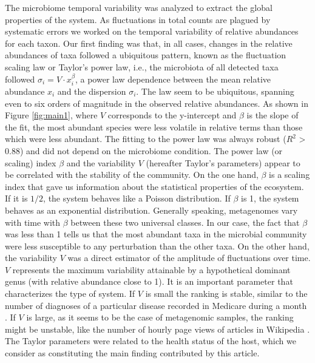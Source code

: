 
The microbiome temporal variability was analyzed to extract the global properties of the system. As fluctuations in total counts are plagued by systematic errors we worked on the temporal variability of relative abundances for each taxon. Our first finding was that, in all cases, changes in the relative abundances of taxa followed a ubiquitous pattern, known as the fluctuation scaling law\cite{fs} or Taylor's power law\cite{taylor}, i.e., the microbiota of all detected taxa followed $\sigma_i  = V\cdot x_i^{\beta}$, a power law dependence between the mean relative abundance $x_i$ and the dispersion $\sigma_i$. The law seem to be ubiquitous, spanning even to six orders of magnitude in the observed relative abundances. As shown in Figure \ref{fig:main1}, where $V$ corresponds to the y-intercept and $\beta$ is the slope of the fit, the most abundant species were less volatile in relative terms than those which were less abundant. The fitting to the power law was always robust ($R^{2}$ > 0.88) and did not depend on the microbiome condition. The power law (or scaling) index $\beta$ and the variability $V$ (hereafter Taylor's parameters) appear to be correlated with the stability of the community. On the one hand, $\beta$ is a scaling index that gave us information about the statistical properties of the ecosystem. If it is $1/2$, the system behaves like a Poisson distribution. If $\beta$ is 1, the system behaves as an exponential distribution. Generally speaking, metagenomes vary with time with $\beta$ between these two universal classes. In our case, the fact that $\beta$ was less than 1 tells us that the most abundant taxa in the microbial community were less susceptible to any perturbation than the other taxa. On the other hand, the variability $V$ was a direct estimator of the amplitude of fluctuations over time. $V$ represents the maximum variability attainable by a hypothetical dominant genus (with relative abundance close to 1). It is an important parameter that characterizes the type of system. If $V$ is small the ranking is stable, similar to the number of diagnoses of a particular disease recorded in Medicare  during a month \cite{medicare}. If $V$ is large, as it seems to be the case of metagenomic samples, the ranking might be unstable, like the number of hourly page views of articles in Wikipedia \cite{ranking,fs}. The Taylor parameters were related to the health status of the host, which we consider as constituting the main finding contributed by this article.

